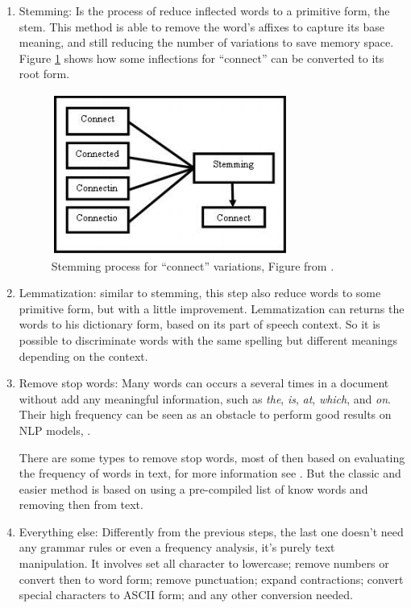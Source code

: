	\begin{enumerate}
		\item Stemming: Is the process of reduce inflected words to a primitive form, the stem. This method is able to remove the word's affixes to capture its base meaning, and still reducing the number of variations to save memory space. Figure \ref{fig:stemming} shows how some inflections for ``connect'' can be converted to its root form.
		
		\begin{figure}[h!]
			\centering
			\includegraphics[width=0.45\linewidth]{01.Chapters/02.Background/stemming}
			\caption{Stemming process for ``connect'' variations, Figure from  \cite{vijayarani2015preprocessing}.}
			\label{fig:stemming}
		\end{figure}
		
		
		\item Lemmatization: similar to stemming, this step also reduce words to some primitive form, but with a little improvement. Lemmatization can returns the words to his dictionary form, based on its part of speech context. So it is possible to discriminate words with the same spelling but different meanings depending on the context. 	
		
		\item Remove stop words:
		Many words can occurs a several times in a document without add any meaningful information, such as \textit{the}, \textit{is}, \textit{at}, \textit{which}, and \textit{on}. Their high frequency can be seen as an obstacle to perform good results on NLP models, \cite{kannan2014preprocessing}. 
		
		There are some types to remove stop words, most of then based on evaluating the frequency of words in text, for more information see \cite{vijayarani2015preprocessing}. But the classic and easier method is based on using a pre-compiled list of know words and removing then from text.
		
		\item Everything else:
		Differently from the previous steps, the last one doesn't need any grammar rules or even a frequency analysis, it's purely text manipulation. It involves set all character to lowercase; remove numbers or convert then to word form; remove punctuation; expand contractions; convert special characters to ASCII form; and any other conversion needed.		 	
	\end{enumerate}
	
